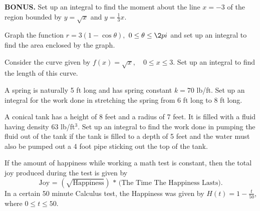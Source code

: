\documentclass{exam}[12pt]
\begin{document}
\begin{questions}
{\question[2] \textbf{BONUS.} Set up an integral to find the moment about the line $x=-3$ of the
region bounded by $y=\sqrt{x}$ and $y= \frac{1}{3} x$.  
\vspace{1.0in}

\question[10] Graph the function $r=3(1-\cos\theta),$ $0\leq\theta\leq\2pi$ 
and set up an
integral to find the area enclosed by the graph.
\vspace{2.2in}

\pagebreak

\question[8] Consider the curve given by $f(x)=\displaystyle \sqrt{x}, \quad 0\leq x\leq 3$.
Set up an integral to find the length of this curve.
\vspace{1.8in}


\question[6] A spring is naturally 5 ft long and has spring constant $k=70$ lb/ft.  Set up an 
integral for the work done in stretching the spring from 6 ft long to 8 ft long.
\vspace{1.5in}


\question[12] A conical tank has a height of 8 feet and a radius of 7 feet.
It is filled with a fluid having density 63 lb/ft$^3$.
Set up an integral to find the work done in pumping the fluid out of the tank if
the tank is filled to a depth of 5 feet and the water must also be
 pumped out a 4 foot pipe sticking
out the top of the tank.





\pagebreak
\question  
If the amount of happiness while working a math test is constant,
then the total joy produced during the test is given by
\[
\text{Joy = $\left(\sqrt{{\text{Happiness}}}\right)$ * (The Time The Happiness Lasts)}.
\]
In a certain 50 minute Calculus test, the Happiness was given by $\displaystyle H(t) = 1 - \frac{t}{50}$, where
$0\leq t\leq 50$.
}
\end{questions}
\end{document}

